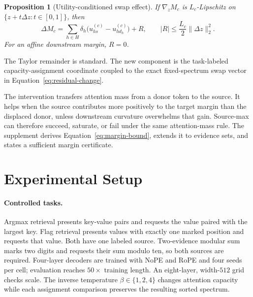 \documentclass[letterpaper]{article} %
\newtheorem{proposition}{Proposition}
\begin{document}
\begin{proposition}[Utility-conditioned swap effect]
If $\nabla_z M_c$ is $L_c$-Lipschitz on $\{z+t\Delta z:t\in[0,1]\}$, then
\begin{equation}
 \Delta M_c=
 \sum_{h\in H}\delta_h\big(u_{hs}^{(c)}-u_{hd_h}^{(c)}\big)+R,
 \qquad |R|\le\frac{L_c}{2}\lVert\Delta z\rVert_2^2.
\label{eq:margin-bound}
\end{equation}
For an affine downstream margin, $R=0$.
\label{prop:utility}
\end{proposition}

The Taylor remainder is standard. The new component is the task-labeled capacity-assignment coordinate coupled
to the exact fixed-spectrum swap vector in Equation~\ref{eq:residual-change}.

The intervention transfers attention mass from a donor token to the source. It helps when the source
contributes more positively to the target margin than the displaced donor, unless downstream curvature
overwhelms that gain. Source-max can therefore succeed, saturate, or fail under the same attention-mass rule.
The supplement derives Equation~\ref{eq:margin-bound}, extends it to evidence sets, and states a sufficient
margin certificate.

\section{Experimental Setup}

\paragraph{Controlled tasks.}
Argmax retrieval presents key-value pairs and requests the value paired with the largest key. Flag retrieval
presents values with exactly one marked position and requests that value. Both have one labeled source.
Two-evidence modular sum marks two digits and requests their sum modulo ten, so both sources are required.
Four-layer decoders are trained with NoPE and RoPE and four seeds per cell; evaluation reaches $50\times$
training length. An eight-layer, width-$512$ grid checks scale. The inverse temperature $\beta\in\{1,2,4\}$
changes attention capacity while each assignment comparison preserves the resulting sorted spectrum.
\end{document}
